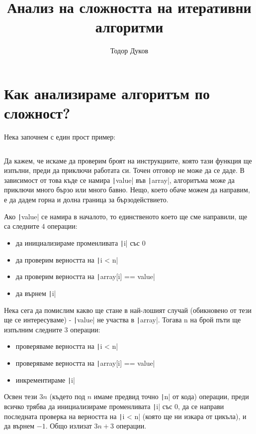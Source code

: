 \documentclass{article}
\title{Анализ на сложността на итеративни алгоритми}
\author{Тодор Дуков}
\date{}
\theoremstyle{definition}
\theoremstyle{plain}
\theoremstyle{remark}
\theoremstyle{definition}
\begin{document}
\maketitle

\section*{Как анализираме алгоритъм по сложност?}

Нека започнем с един прост пример:

\inputminted[linenos]{c++}{algorithms/find.cpp}

Да кажем, че искаме да проверим броят на инструкциите, която тази функция ще изпълни, преди да приключи работата си.
Точен отговор не може да се даде.
В зависимост от това къде се намира \texttt|value| във \texttt|array|, алгоритъма може да приключи много бързо или много бавно.
Нещо, което обаче можем да направим, е да дадем горна и долна граница за бързодействието.

Ако \texttt|value| се намира в началото, то единственото което ще сме направили, ще са следните $4$ операции:
\begin{itemize}
    \item да инициализираме променливата \texttt|i| със $0$
    \item да проверим верността на \texttt|i < n|
    \item да проверим верността на \texttt|array[i] == value|
    \item да върнем \texttt|i|
\end{itemize}

Нека сега да помислим какво ще стане в най-лошият случай (обикновено от тези ще се интересуваме) - \texttt|value| не участва в \texttt|array|.
Тогава n на брой пъти ще изпълним следните $3$ операции:
\begin{itemize}
    \item проверяваме верността на \texttt|i < n|
    \item проверяваме верността на \texttt|array[i] == value|
    \item инкрементираме \texttt|i|
\end{itemize}
Освен тези $3n$ (където под $n$ имаме предвид точно \texttt|n| от кода) операции, преди всичко трябва да инициализираме променливата \texttt|i| със $0$, да се направи последната проверка на верността на \texttt|i < n| (която ще ни изкара от цикъла), и да върнем $-1$.
Общо излизат $3n + 3$ операции.
\end{document}

